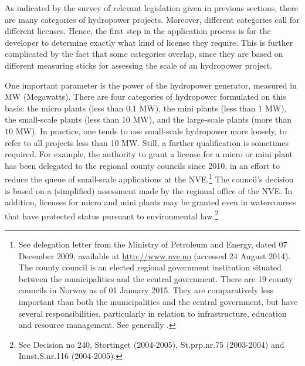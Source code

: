 
As indicated by the survey of relevant legislation given in previous sections, there are many categories of hydropower projects. Moreover, different categories call for different licenses. Hence, the first step in the application process is for the developer to determine exactly what kind of license they require. This is further complicated by the fact that some categories overlap, since they are based on different measuring sticks for assessing the scale of an hydropower project. 

One important parameter is the power of the hydropower generator, measured in MW (Megawatts). There are four categories of hydropower formulated on this basis: the micro plants (less than $0.1$ MW), the mini plants (less than $1$ MW), the small-scale plants (less than $10$ MW), and the large-scale plants (more than $10$ MW). In practice, one tends to use small-scale hydropower more loosely, to refer to all projects less than 10 MW. Still, a further qualification is sometimes required. For example, the authority to grant a license for a micro or mini plant has been delegated to the regional county councils since 2010, in an effort to reduce the queue of small-scale applications at the NVE.\footnote{See delegation letter from the Ministry of Petroleum and Energy, dated 07 December 2009, available at \url{http://www.nve.no} (accessed 24 August 2014). The county council is an elected regional government institution situated between the municipalities and the central government. There are 19 county councils in Norway as of 01 January 2015. They are comparatively less important than both the municipalities and the central government, but have several  responsibilities, particularly in relation to infrastructure, education and resource management. See generally \cite{berg15}.} The council's decision is based on a (simplified) assessment made by the regional office of the NVE. In addition, licenses for micro and mini plants may be granted even in watercourses that have protected status pursuant to environmental law.\footnote{See Decision no 240, Stortinget (2004-2005), St.prp.nr.75 (2003-2004) and Innst.S.nr.116 (2004-2005).}

